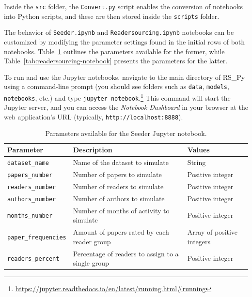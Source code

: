 \documentclass[a4paper, english]{article}
\newcommand{\rspy}{RS\_Py\xspace}
\begin{document}
Inside the \verb|src| folder, the \verb|Convert.py| script enables the conversion of notebooks into Python scripts, and these are then stored inside the \verb|scripts| folder.

The behavior of \verb|Seeder.ipynb| and \verb|Readersourcing.ipynb| notebooks can be customized by modifying the parameter settings found in the initial rows of both notebooks. Table~\ref{tab:seeder-notebook} outlines the parameters available for the former, while Table~\ref{tab:readersourcing-notebook} presents the parameters for the latter.

To run and use the Jupyter notebooks, navigate to the main directory of \rspy using a command-line prompt (you should see folders such as \verb|data|, \verb|models|, \verb|notebooks|, etc.) and type \verb|jupyter notebook|.\footnote{\url{https://jupyter.readthedocs.io/en/latest/running.html\#running}} This command will start the Jupyter server, and you can access the \emph{Notebook Dashboard} in your browser at the web application's URL (typically, \verb|http://localhost:8888|).

\begin{table}
\centering
\begin{tabular}{p{3cm}p{7cm}p{3cm}}
\toprule
\textbf{Parameter} & \textbf{Description} & \textbf{Values} \\
\midrule
\verb|dataset_name| & Name of the dataset to simulate & String \\
\verb|papers_number| & Number of papers to simulate & Positive integer \\
\verb|readers_number| & Number of readers to simulate & Positive integer \\
\verb|authors_number| & Number of authors to simulate & Positive integer \\
\verb|months_number| & Number of months of activity to simulate & Positive integer \\
\verb|paper_frequencies| & Amount of papers rated by each reader group & Array of positive integers \\
\verb|readers_percent| & Percentage of readers to assign to a single group & Positive integer\\
\bottomrule
\end{tabular}
\caption{Parameters available for the Seeder Jupyter notebook.}
\label{tab:seeder-notebook}
\end{table}
\end{document}
